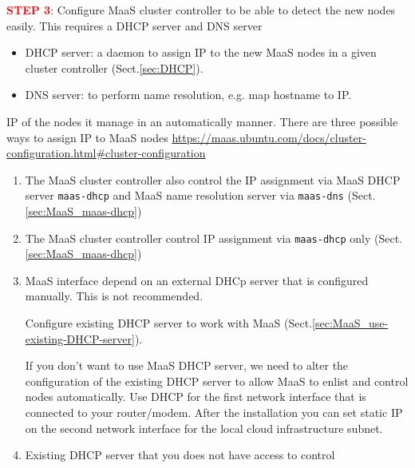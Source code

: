 \textcolor{red}{\bf STEP 3}: Configure MaaS cluster controller to be able to
detect the new nodes easily. This requires a DHCP server and DNS server
\begin{itemize}
  \item DHCP server: a daemon to assign IP to the new MaaS nodes in a given
  cluster controller (Sect.\ref{sec:DHCP}).
  
  \item DNS server: to perform name resolution, e.g. map hostname to IP.
\end{itemize}

IP of the nodes it manage in an automatically
manner.
There are three possible ways to assign IP to MaaS nodes
\url{https://maas.ubuntu.com/docs/cluster-configuration.html\#cluster-configuration}

\begin{enumerate}
  \item The MaaS cluster controller also control the IP assignment via
  MaaS DHCP server \verb!maas-dhcp! and MaaS name resolution server via
  \verb!maas-dns! (Sect.\ref{sec:MaaS_maas-dhcp})

%   
  
  
  \item The MaaS cluster controller control IP assignment via
  \verb!maas-dhcp! only  (Sect.\ref{sec:MaaS_maas-dhcp})
  
  
  \item MaaS interface depend on an external DHCp server that is configured
  manually. This is not recommended.
  
   Configure existing DHCP server to work with MaaS
  (Sect.\ref{sec:MaaS_use-existing-DHCP-server}).
  
  If you don't want to use MaaS DHCP server, we need to alter the configuration of
the existing DHCP server to allow MaaS to enlist and control nodes
automatically.
Use DHCP for the first network interface that is connected to your router/modem.
After the installation you can set static IP on the second network interface for
the local cloud infrastructure subnet.
  
  \item Existing DHCP server that you does not have access to control
\end{enumerate}




